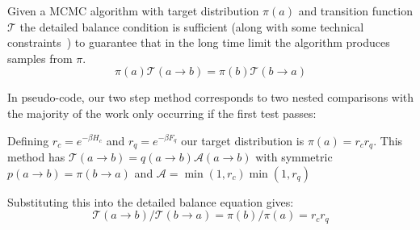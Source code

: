 Given a MCMC algorithm with target distribution \(\pi(a)\) and transition function \(\mathcal{T}\) the detailed balance condition is sufficient (along with some technical constraints~\autocite{wolffMonteCarloErrors2004}) to guarantee that in the long time limit the algorithm produces samples from \(\pi\). \[\pi(a)\mathcal{T}(a \to b) = \pi(b)\mathcal{T}(b \to a)\]

In pseudo-code, our two step method corresponds to two nested comparisons with the majority of the work only occurring if the first test passes:

\begin{Shaded}
\begin{Highlighting}[]
\OperatorTok{=}

 
\OperatorTok{=}

\OperatorTok{=}
  \NormalTok{,}\NormalTok{) }\OperatorTok{\textless{}}\OperatorTok{{-}}\OperatorTok{*}
\OperatorTok{=}
    \NormalTok{,}\NormalTok{) }\OperatorTok{\textless{}}\OperatorTok{{-}}\OperatorTok{*}
\OperatorTok{=}

\OperatorTok{=}
\end{Highlighting}
\end{Shaded}

Defining \(r_c = e^{-\beta H_c}\) and \(r_q = e^{-\beta F_q}\) our target distribution is \(\pi(a) = r_c r_q\). This method has \(\mathcal{T}(a\to b) = q(a\to b)\mathcal{A}(a \to b)\) with symmetric \(p(a \to b) = \pi(b \to a)\) and \(\mathcal{A} = \min\left(1, r_c\right) \min\left(1, r_q\right)\)

Substituting this into the detailed balance equation gives: \[\mathcal{T}(a \to b)/\mathcal{T}(b \to a) = \pi(b)/\pi(a) = r_c r_q\]

